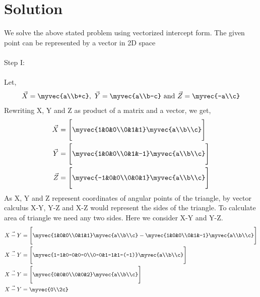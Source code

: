 \documentclass[journal,12pt]{IEEEtran}
\begin{document}
\section{Solution}
We solve the above stated problem using vectorized intercept form. The given point can be represented by a vector in 2D space\\\\
Step I:\\\\
Let,
\begin{align}
\vec{X} = \myvec{a\\b+c}, \text{ } \vec{Y} = \myvec{a\\b-c} \text{ and } \vec{Z} = \myvec{-a\\c}
\label{eq1}
\end{align}
Rewriting X, Y and Z as product of a matrix and a vector, we get,\\
\begin{align}
\begin{split}
\vec{X} & = \Bigg[\myvec{1&0&0\\0&1&1}\myvec{a\\b\\c}\Bigg] \\
\vec{Y} & = \Bigg[\myvec{1&0&0\\0&1&-1}\myvec{a\\b\\c}\Bigg] \\
\vec{Z} & = \Bigg[\myvec{-1&0&0\\0&0&1}\myvec{a\\b\\c}\Bigg] 
\end{split}
\label{eq2}
\end{align}
As X, Y and Z represent coordinates of angular points of the triangle, by vector calculus X-Y, Y-Z and X-Z would represent the sides of the triangle. To calculate area of triangle we need any two sides. Here we consider X-Y and Y-Z.\\
\begin{align}
\vec{X-Y} & = \Bigg[\myvec{1&0&0\\0&1&1}\myvec{a\\b\\c} - \myvec{1&0&0\\0&1&-1}\myvec{a\\b\\c}\Bigg] \\
\vec{X-Y} & = \Bigg[\myvec{1-1&0-0&0-0\\0-0&1-1&1-(-1)}\myvec{a\\b\\c}\Bigg] \\
\vec{X-Y} & = \Bigg[\myvec{0&0&0\\0&0&2}\myvec{a\\b\\c}\Bigg] \\
\vec{X-Y} & = \myvec{0\\2c}
\label{eq3}
\end{align}
\end{document}
